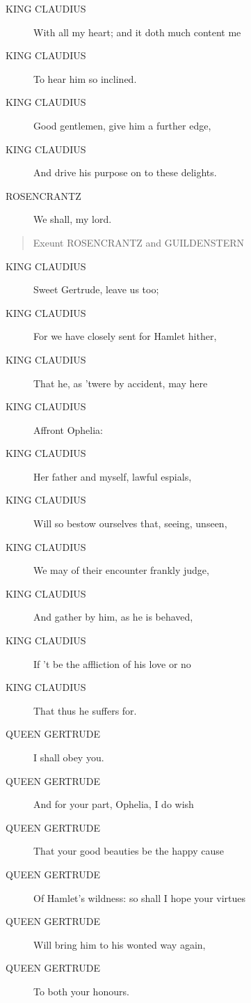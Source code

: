\documentclass{article}
\begin{document}
\begin{description}
            
\item[KING CLAUDIUS] With all my heart; and it doth much content me
\item[KING CLAUDIUS] To hear him so inclined.
\item[KING CLAUDIUS] Good gentlemen, give him a further edge,
\item[KING CLAUDIUS] And drive his purpose on to these delights.
\end{description}
          
\begin{description}
            
\item[ROSENCRANTZ] We shall, my lord.
\end{description}
          
\begin{quote}
Exeunt ROSENCRANTZ and GUILDENSTERN
\end{quote}
          
\begin{description}
            
\item[KING CLAUDIUS] Sweet Gertrude, leave us too;
\item[KING CLAUDIUS] For we have closely sent for Hamlet hither,
\item[KING CLAUDIUS] That he, as 'twere by accident, may here
\item[KING CLAUDIUS] Affront Ophelia:
\item[KING CLAUDIUS] Her father and myself, lawful espials,
\item[KING CLAUDIUS] Will so bestow ourselves that, seeing, unseen,
\item[KING CLAUDIUS] We may of their encounter frankly judge,
\item[KING CLAUDIUS] And gather by him, as he is behaved,
\item[KING CLAUDIUS] If 't be the affliction of his love or no
\item[KING CLAUDIUS] That thus he suffers for.
\end{description}
          
\begin{description}
            
\item[QUEEN GERTRUDE] I shall obey you.
\item[QUEEN GERTRUDE] And for your part, Ophelia, I do wish
\item[QUEEN GERTRUDE] That your good beauties be the happy cause
\item[QUEEN GERTRUDE] Of Hamlet's wildness: so shall I hope your virtues
\item[QUEEN GERTRUDE] Will bring him to his wonted way again,
\item[QUEEN GERTRUDE] To both your honours.
\end{description}
          
\end{document}

